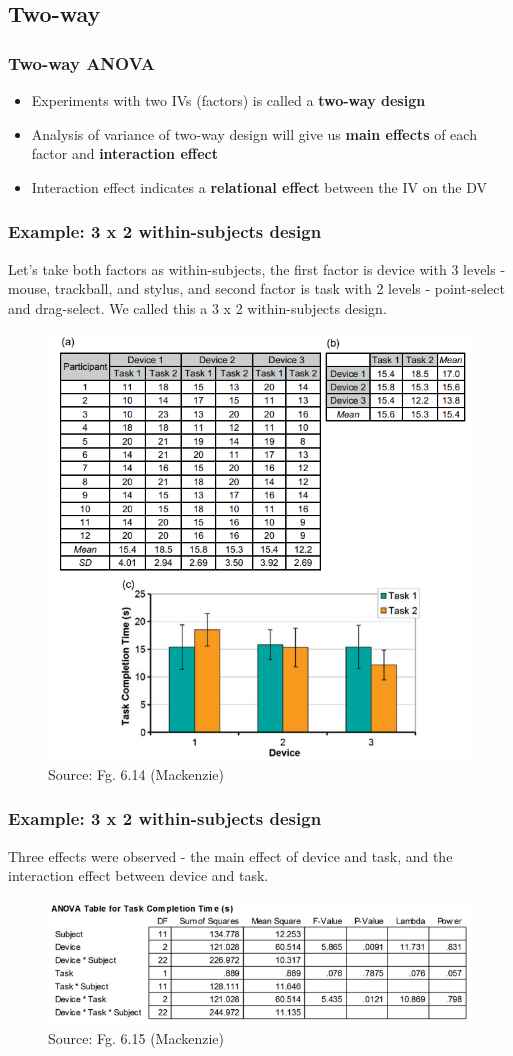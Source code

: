 \documentclass{beamer}
\begin{document}
\subsection{Two-way}

\begin{frame}
	\frametitle{Two-way ANOVA} 
	\begin{itemize}
		\item Experiments with two IVs (factors) is called a \textbf{two-way design}
		\item Analysis of variance of two-way design will give us \textbf{main effects} of each factor and \textbf{interaction effect}
		\item Interaction effect indicates a \textbf{relational effect} between the IV on the DV
	\end{itemize}
\end{frame}

\begin{frame}
	\footnotesize
	\frametitle{Example: 3 x 2 within-subjects design} 
	Let's take both factors as within-subjects, the first factor is device with 3 levels - mouse, trackball, and stylus, and second factor is task with 2 levels - point-select and drag-select.  We called this a 3 x 2 within-subjects design.
	\begin{figure}
		\includegraphics[width=0.43\linewidth]{2way}
		\caption{Source: Fg. 6.14 (Mackenzie)}
	\end{figure}
\end{frame}

\begin{frame}
	\footnotesize
	\frametitle{Example: 3 x 2 within-subjects design} 
	Three effects were observed - the main effect of device and task, and the interaction effect between device and task.
	\begin{figure}
		\includegraphics[width=0.9\linewidth]{2way-result}
		\caption{Source: Fg. 6.15 (Mackenzie)}
	\end{figure}
\end{frame}
\end{document}
